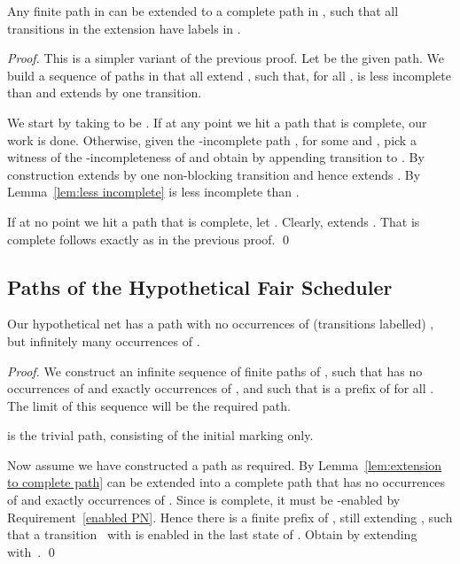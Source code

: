 \documentclass[smallcondensed]{svjour3}
\newcommand{\Lem}[1]{Lemma~\ref{lem:#1}}
\begin{document}
\begin{lemma}\label{lem:extension to complete path}
Any finite path in  can be extended to a complete path in , such that all transitions in the
extension have labels in .
\end{lemma}
\begin{proof}
This is a simpler variant of the previous proof.
Let  be the given path.
We build a sequence  of paths in  that all extend , such that, for all ,
 is less incomplete than  and extends  by one transition.

We start by taking  to be .
If at any point we hit a path  that is complete, our work is done.
Otherwise, given the -incomplete path , for some  and ,
pick a witness  of the -incompleteness of 
and obtain 
by appending transition  to .
By construction  extends  by one non-blocking transition and hence extends .
By \Lem{less incomplete}  is less incomplete than .

If at no point we hit a path  that is complete, let .
Clearly,  extends . That  is complete follows exactly as in the previous proof.
\qed
\end{proof}

\subsection{Paths of the Hypothetical Fair Scheduler}

\begin{lemma}\label{lem:PN1}
  Our hypothetical net  has a path with no occurrences of (transitions labelled) , but infinitely many occurrences
  of .
\end{lemma}
\begin{proof}
We construct an infinite sequence  of finite paths of ,
such that  has no occurrences of  and exactly  occurrences
of , and such that  is a prefix of  for all .
The limit of this sequence will be the required path.

 is  the trivial path, consisting of the initial marking  only.

Now assume we have constructed a path  as required.
By \Lem{extension to complete path}  can be extended into a complete path  that has no occurrences of  and
exactly  occurrences of . Since  is complete, it must be -enabled by Requirement~\ref{enabled PN}.
Hence there is a finite prefix  of , still extending , such that a
transition~ with  is enabled in the last state of .
Obtain  by extending  with~.
\qed
\end{proof}
\end{document}
